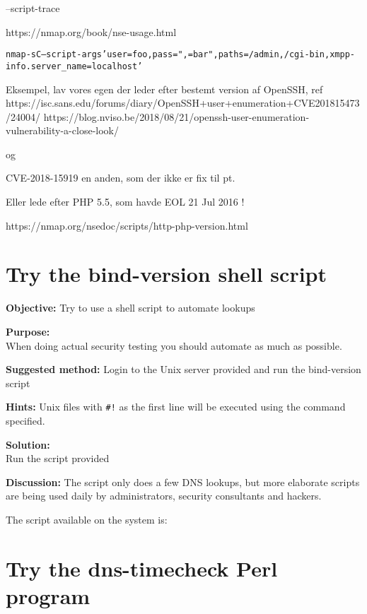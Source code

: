 \documentclass[a4paper,11pt,notitlepage]{report}
\begin{document}
--script-trace

https://nmap.org/book/nse-usage.html
\begin{alltt}
  nmap -sC --script-args 'user=foo,pass=",{}=bar",paths={/admin,/cgi-bin},xmpp-info.server_name=localhost'
\end{alltt}

Eksempel, lav vores egen der leder efter bestemt version af OpenSSH, ref
https://isc.sans.edu/forums/diary/OpenSSH+user+enumeration+CVE201815473/24004/
https://blog.nviso.be/2018/08/21/openssh-user-enumeration-vulnerability-a-close-look/

og

CVE-2018-15919 en anden, som der ikke er fix til pt.

Eller lede efter PHP 5.5, som havde EOL 21 Jul 2016 !

https://nmap.org/nsedoc/scripts/http-php-version.html


\chapter{Try the bind-version shell script}
\label{ex:bind-version-script}

{\bf Objective:}
Try to use a shell script to automate lookups

{\bf Purpose:}\\
When doing actual security testing you should automate as much as possible.

{\bf Suggested method:}
Login to the Unix server provided and run the bind-version script

{\bf Hints:}
Unix files with \verb+#!+ as the first line will be executed using the command specified.


{\bf Solution:}\\
Run the script provided

{\bf Discussion:}
The script only does a few DNS lookups, but more elaborate scripts are being used daily by administrators, security consultants and hackers.

The script available on the system is:

\begin{alltt}\small

\end{alltt}


\chapter{Try the dns-timecheck Perl program}
\label{ex:dns-timecheck}
\end{document}
